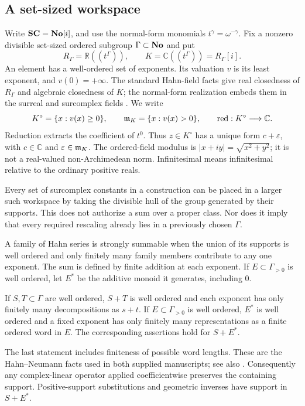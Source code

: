 \documentclass[11pt,letterpaper]{article}
\theoremstyle{definition}
\theoremstyle{remark}
\newcommand{\C}{\mathbb C}\newcommand{\R}{\mathbb R}\newcommand{\Q}{\mathbb Q}\newcommand{\Z}{\mathbb Z}\newcommand{\N}{\mathbb N}
\numberwithin{equation}{section}
\begin{document}
\subsection{A set-sized workspace}
Write $\mathbf{SC}=\mathbf{No}[i]$, and use the normal-form monomials $t^\gamma=\omega^{-\gamma}$. Fix a nonzero divisible set-sized ordered subgroup $\Gamma\subset\mathbf{No}$ and put
\begin{equation}\label{eq:fields}
 R_\Gamma=\R((t^\Gamma)),\qquad K=\C((t^\Gamma))=R_\Gamma[i].
\end{equation}
An element has a well-ordered set of exponents. Its valuation $v$ is its least exponent, and $v(0)=+\infty$. The standard Hahn-field facts give real closedness of $R_\Gamma$ and algebraic closedness of $K$; the normal-form realization embeds them in the surreal and surcomplex fields \cite{Poonen,Analysis,Geometry}. We write
\[
 K^\circ=\{x:v(x)\ge0\},\qquad \m_K=\{x:v(x)>0\},\qquad
 \red:K^\circ\longrightarrow\C.
\]
Reduction extracts the coefficient of $t^0$. Thus $z\in K^\circ$ has a unique form $c+\varepsilon$, with $c\in\C$ and $\varepsilon\in\mathfrak m_K$. The ordered-field modulus is $|x+iy|=\sqrt{x^2+y^2}$; it is not a real-valued non-Archimedean norm. Infinitesimal means infinitesimal relative to the ordinary positive reals.

Every set of surcomplex constants in a construction can be placed in a larger such workspace by taking the divisible hull of the group generated by their supports. This does not authorize a sum over a proper class. Nor does it imply that every required rescaling already lies in a previously chosen $\Gamma$.

\begin{definition}
A family of Hahn series is strongly summable when the union of its supports is well ordered and only finitely many family members contribute to any one exponent. The sum is defined by finite addition at each exponent. If $E\subset\Gamma_{>0}$ is well ordered, let $E^*$ be the additive monoid it generates, including $0$.
\end{definition}

\begin{lemma}\label{lem:support}
If $S,T\subset\Gamma$ are well ordered, $S+T$ is well ordered and each exponent has only finitely many decompositions as $s+t$. If $E\subset\Gamma_{>0}$ is well ordered, $E^*$ is well ordered and a fixed exponent has only finitely many representations as a finite ordered word in $E$. The corresponding assertions hold for $S+E^*$.
\end{lemma}
The last statement includes finiteness of possible word lengths. These are the Hahn--Neumann facts used in both supplied manuscripts; see also \cite{Neumann,Poonen}. Consequently any complex-linear operator applied coefficientwise preserves the containing support. Positive-support substitutions and geometric inverses have support in $S+E^*$.
\end{document}
